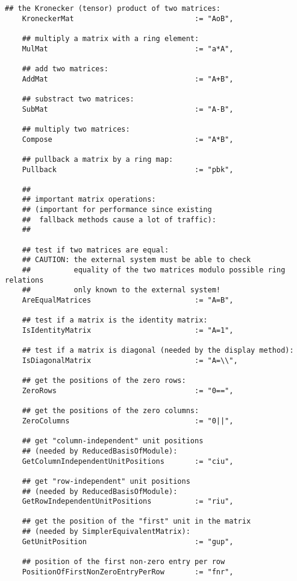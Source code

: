 \documentclass[a4paper,11pt]{report}
\begin{document}
{{{\begin{Verbatim}[fontsize=\small,frame=single,label=Code]
    ## the Kronecker (tensor) product of two matrices:
    KroneckerMat                            := "AoB",
    
    ## multiply a matrix with a ring element:
    MulMat                                  := "a*A",
    
    ## add two matrices:
    AddMat                                  := "A+B",
    
    ## substract two matrices:
    SubMat                                  := "A-B",
    
    ## multiply two matrices:
    Compose                                 := "A*B",
    
    ## pullback a matrix by a ring map:
    Pullback                                := "pbk",
    
    ##
    ## important matrix operations:
    ## (important for performance since existing
    ##  fallback methods cause a lot of traffic):
    ##
    
    ## test if two matrices are equal:
    ## CAUTION: the external system must be able to check
    ##          equality of the two matrices modulo possible ring relations
    ##          only known to the external system!
    AreEqualMatrices                        := "A=B",
    
    ## test if a matrix is the identity matrix:
    IsIdentityMatrix                        := "A=1",
    
    ## test if a matrix is diagonal (needed by the display method):
    IsDiagonalMatrix                        := "A=\\",
    
    ## get the positions of the zero rows:
    ZeroRows                                := "0==",
    
    ## get the positions of the zero columns:
    ZeroColumns                             := "0||",
    
    ## get "column-independent" unit positions
    ## (needed by ReducedBasisOfModule):
    GetColumnIndependentUnitPositions       := "ciu",
    
    ## get "row-independent" unit positions
    ## (needed by ReducedBasisOfModule):
    GetRowIndependentUnitPositions          := "riu",
    
    ## get the position of the "first" unit in the matrix
    ## (needed by SimplerEquivalentMatrix):
    GetUnitPosition                         := "gup",
    
    ## position of the first non-zero entry per row
    PositionOfFirstNonZeroEntryPerRow       := "fnr",
    

\end{Verbatim}}}}
\end{document}
